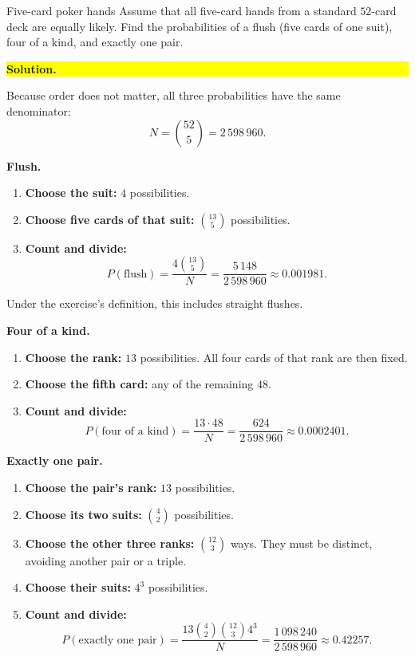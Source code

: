 \documentclass[a4paper,12pt,oneside]{report}
\newcommand{\exerciseheading}[1]{%
  \par\Needspace{5\baselineskip}\noindent\textbf{#1}\par\nobreak}
\newcommand{\solutionheading}[1]{%
  \par\Needspace{5\baselineskip}\noindent
  \begingroup\setlength{\fboxsep}{1pt}%
  \colorbox{yellow}{\strut\textbf{#1}}\endgroup\par\nobreak}
\begin{document}
\begin{framedexercise}{Five-card poker hands}
Assume that all five-card hands from a standard $52$-card deck are
equally likely. Find the probabilities of a flush (five cards of
one suit), four of a kind, and exactly one pair.
\end{framedexercise}

\solutionheading{Solution.}
Because order does not matter, all three probabilities have the same
denominator:
\[
  N=\binom{52}{5}=2\,598\,960.
\]

\exerciseheading{Flush.}
\begin{enumerate}[label=\textbf{Step \arabic*:},leftmargin=*]
  \item \textbf{Choose the suit:} $4$ possibilities.
  \item \textbf{Choose five cards of that suit:} $\binom{13}{5}$
  possibilities.
  \item \textbf{Count and divide:}
  \[
    \boxed{P(\text{flush})
      =\frac{4\binom{13}{5}}{N}
      =\frac{5\,148}{2\,598\,960}
      \approx 0.001981.}
  \]
\end{enumerate}
Under the exercise's definition, this includes straight flushes.

\exerciseheading{Four of a kind.}
\begin{enumerate}[label=\textbf{Step \arabic*:},leftmargin=*]
  \item \textbf{Choose the rank:} $13$ possibilities. All four cards
  of that rank are then fixed.
  \item \textbf{Choose the fifth card:} any of the remaining $48$.
  \item \textbf{Count and divide:}
  \[
    \boxed{P(\text{four of a kind})
      =\frac{13\cdot48}{N}
      =\frac{624}{2\,598\,960}
      \approx 0.0002401.}
  \]
\end{enumerate}

\exerciseheading{Exactly one pair.}
\begin{enumerate}[label=\textbf{Step \arabic*:},leftmargin=*]
  \item \textbf{Choose the pair's rank:} $13$ possibilities.
  \item \textbf{Choose its two suits:} $\binom42$ possibilities.
  \item \textbf{Choose the other three ranks:} $\binom{12}{3}$ ways.
  They must be distinct, avoiding another pair or a triple.
  \item \textbf{Choose their suits:} $4^3$ possibilities.
  \item \textbf{Count and divide:}
  \[
    \boxed{P(\text{exactly one pair})
      =\frac{13\binom42\binom{12}{3}4^3}{N}
      =\frac{1\,098\,240}{2\,598\,960}
      \approx 0.42257.}
  \]
\end{enumerate}
\clearpage
\end{document}
